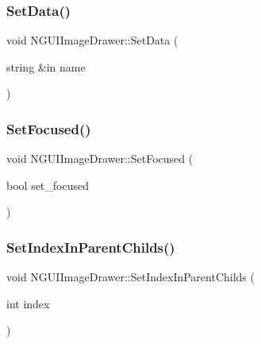 \hypertarget{class_n_g_u_i_image_drawer_a6e3f8f6d844484edb699ac9f4b4ab26d}{}\label{class_n_g_u_i_image_drawer_a6e3f8f6d844484edb699ac9f4b4ab26d} 
\subsubsection{\texorpdfstring{Set\+Data()}{SetData()}}
{\footnotesize\ttfamily void N\+G\+U\+I\+Image\+Drawer\+::\+Set\+Data (\begin{DoxyParamCaption}\item[{string \&in}]{name }\end{DoxyParamCaption})}

\hypertarget{class_n_g_u_i_image_drawer_a68e1a81076015f12777397fbc44d53c6}{}\label{class_n_g_u_i_image_drawer_a68e1a81076015f12777397fbc44d53c6} 
\subsubsection{\texorpdfstring{Set\+Focused()}{SetFocused()}}
{\footnotesize\ttfamily void N\+G\+U\+I\+Image\+Drawer\+::\+Set\+Focused (\begin{DoxyParamCaption}\item[{bool}]{set\+\_\+focused }\end{DoxyParamCaption})}

\hypertarget{class_n_g_u_i_image_drawer_a2ea06d9671204fe1d5330cb947b9586b}{}\label{class_n_g_u_i_image_drawer_a2ea06d9671204fe1d5330cb947b9586b} 
\subsubsection{\texorpdfstring{Set\+Index\+In\+Parent\+Childs()}{SetIndexInParentChilds()}}
{\footnotesize\ttfamily void N\+G\+U\+I\+Image\+Drawer\+::\+Set\+Index\+In\+Parent\+Childs (\begin{DoxyParamCaption}\item[{int}]{index }\end{DoxyParamCaption})}

